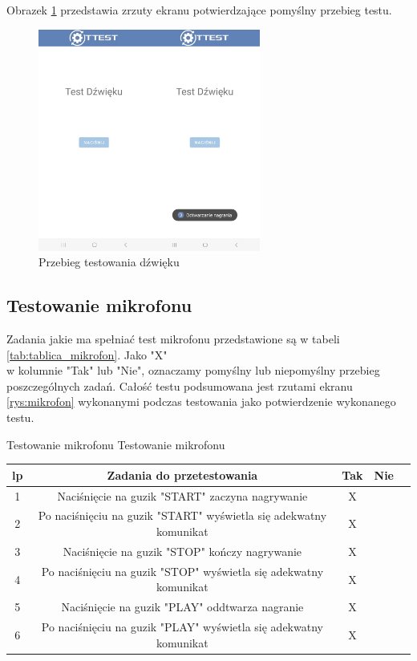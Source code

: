 Obrazek \ref{rys:dzwiek} przedstawia zrzuty ekranu potwierdzające pomyślny przebieg testu.

\begin{figure}[!hbt]
	\begin{center}
		\includegraphics[angle=360, width=0.65\textwidth]{rys/punkt5/dzwiek.png}
		\caption{Przebieg testowania dźwięku}
		\label{rys:dzwiek}
	\end{center}
\end{figure} 

\newpage


\subsection{Testowanie mikrofonu}

Zadania jakie ma spełniać test mikrofonu przedstawione są w tabeli \ref{tab:tablica_mikrofon}. Jako "X" \\ w kolumnie "Tak" lub "Nie", oznaczamy pomyślny lub niepomyślny przebieg poszczególnych zadań. Całość testu podsumowana jest rzutami ekranu \ref{rys:mikrofon} wykonanymi podczas testowania jako potwierdzenie wykonanego testu.

\begin{tabela}
	{Testowanie mikrofonu}	%
	{Testowanie mikrofonu}	%
	{
		\begin{tabular}{|c|c|c|c|c|} \hline
			\textbf{lp} & \textbf{Zadania do przetestowania} & \textbf{Tak} & \textbf{Nie} \\ \hline
			1 & Naciśnięcie na guzik "START" zaczyna nagrywanie & X & ~ \\ \hline
			2 & Po naciśnięciu na guzik "START" wyświetla się adekwatny komunikat & X & ~ \\ \hline
			3 & Naciśnięcie na guzik "STOP" kończy nagrywanie & X & ~ \\ \hline
			4 & Po naciśnięciu na guzik "STOP" wyświetla się adekwatny komunikat & X & ~ \\ \hline
			5 & Naciśnięcie na guzik "PLAY" oddtwarza nagranie & X & ~ \\ \hline
			6 &  Po naciśnięciu na guzik "PLAY" wyświetla się adekwatny komunikat & X & ~ \\ \hline
	\end{tabular}	}
	\label{tab:tablica_mikrofon}
\end{tabela}

